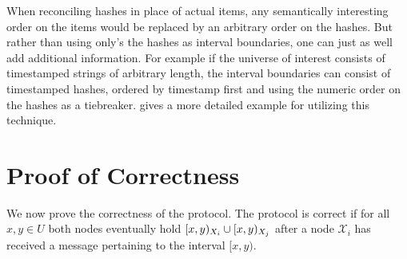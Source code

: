 When reconciling hashes in place of actual items, any semantically interesting order on the items would be replaced by an arbitrary order on the hashes. But rather than using only's the hashes as interval boundaries, one can just as well add additional information. For example if the universe of interest consists of timestamped strings of arbitrary length, the interval boundaries can consist of timestamped hashes, ordered by timestamp first and using the numeric order on the hashes as a tiebreaker.  gives a more detailed example for utilizing this technique.

\section{Proof of Correctness}
\label{set-reconciliation-simple-correct}

\newcommand{\intcount}[1]{\mathit{count}_{#1}}

We now prove the correctness of the protocol. The protocol is correct if for all $x, y \in U$ both nodes eventually hold $[{x},{y})_{X_i} \cup [{x},{y})_{X_j}$ after a node $\mathcal{X}_i$ has received a message pertaining to the interval $[x, y)$.

